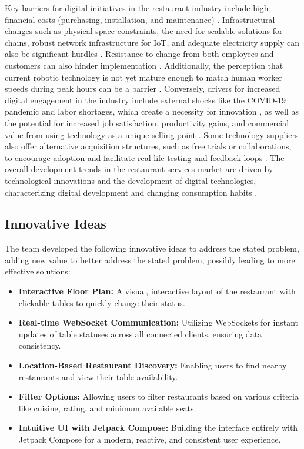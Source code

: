 \documentclass{article}
\begin{document}
Key barriers for digital initiatives in the restaurant industry include high financial costs (purchasing, installation, and maintenance) \parencite{buurman2024investigating}. Infrastructural changes such as physical space constraints, the need for scalable solutions for chains, robust network infrastructure for IoT, and adequate electricity supply can also be significant hurdles \parencite{buurman2024investigating}. Resistance to change from both employees and customers can also hinder implementation \parencite{buurman2024investigating}. Additionally, the perception that current robotic technology is not yet mature enough to match human worker speeds during peak hours can be a barrier \parencite{buurman2024investigating}. Conversely, drivers for increased digital engagement in the industry include external shocks like the COVID-19 pandemic and labor shortages, which create a necessity for innovation \parencite{buurman2024investigating}, as well as the potential for increased job satisfaction, productivity gains, and commercial value from using technology as a unique selling point \parencite{buurman2024investigating}. Some technology suppliers also offer alternative acquisition structures, such as free trials or collaborations, to encourage adoption and facilitate real-life testing and feedback loops \parencite{buurman2024investigating}. The overall development trends in the restaurant services market are driven by technological innovations and the development of digital technologies, characterizing digital development and changing consumption habits \parencite{yudina2024trends}.

\subsection{Innovative Ideas}
The team developed the following innovative ideas to address the stated problem, adding new value to better address the stated problem, possibly leading to more effective solutions:
\begin{itemize}
    \item \textbf{Interactive Floor Plan:} A visual, interactive layout of the restaurant with clickable tables to quickly change their status.
    \item \textbf{Real-time WebSocket Communication:} Utilizing WebSockets for instant updates of table statuses across all connected clients, ensuring data consistency.
    \item \textbf{Location-Based Restaurant Discovery:} Enabling users to find nearby restaurants and view their table availability.
    \item \textbf{Filter Options:} Allowing users to filter restaurants based on various criteria like cuisine, rating, and minimum available seats.
    \item \textbf{Intuitive UI with Jetpack Compose:} Building the interface entirely with Jetpack Compose for a modern, reactive, and consistent user experience.
\end{itemize}
\end{document}
